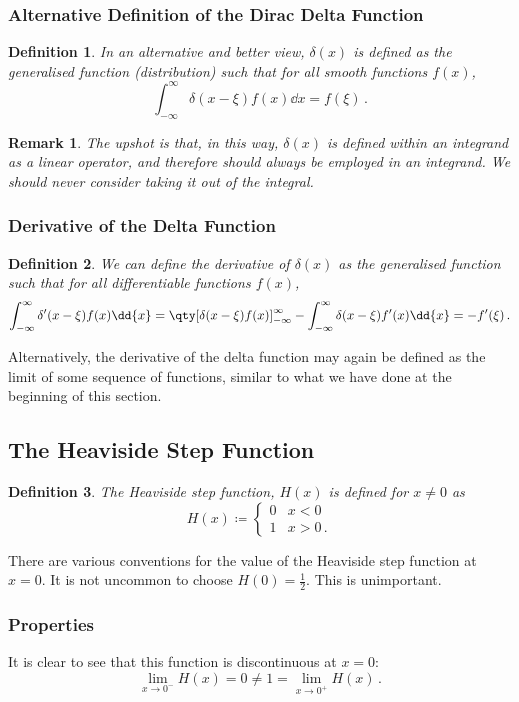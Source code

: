\documentclass{article}
\theoremstyle{plain}\theoremheaderfont{\normalfont\itshape}\theorembodyfont{\rmfamily}\theoremseparator{.}\newtheorem*{rem}{Remark}\newtheorem*{ex}{Example}\newtheorem*{proof}{Proof}\newtheorem*{altp}{Alternative proof}
\theoremstyle{plain}\theoremheaderfont{\normalfont\bfseries}\theorembodyfont{\rmfamily}\theoremseparator{.}\newtheorem{thm}{Theorem}[section]\newtheorem{lem}[thm]{Lemma}\newtheorem{prop}[thm]{Proposition}\newtheorem*{cor}{Corollary}\newtheorem{defn}[thm]{Definition}\newtheorem{clm}[thm]{Claim}\newtheorem{clminproof}{Claim}
\theoremstyle{break}\theoremheaderfont{\normalfont\itshape}\theorembodyfont{\rmfamily}\theoremseparator{.\medskip}\newtheorem*{proofskip}{Proof}\newtheorem*{exs}{Examples}\newtheorem*{rems}{Remarks}
\theoremstyle{break}\theoremheaderfont{\normalfont\bfseries}\theorembodyfont{\rmfamily}\theoremseparator{.\medskip}\newtheorem{lemskip}[thm]{Lemma}\newtheorem{defnskip}[thm]{Definition}\newtheorem{propskip}[thm]{Proposition}\newtheorem{thmskip}[thm]{Theorem}
\numberwithin{equation}{section}
\begin{document}
	\subsubsection{Alternative Definition of the Dirac Delta Function}
	\begin{defn}
		In an alternative and better view, \(\delta(x)\) is defined as the generalised function (distribution) such that for all smooth functions \(f(x)\),
		\[\int_{-\infty}^{\infty}\delta(x-\xi)f(x)\dd{x}=f(\xi)\,.\]
	\end{defn}
	\begin{rem}
		The upshot is that, in this way, \(\delta(x)\) is defined within an integrand as a linear operator, and therefore should always be employed in an integrand. We should never consider taking it out of the integral.
	\end{rem}
	\subsubsection{Derivative of the Delta Function}
	\begin{defn}
		We can define the derivative of \(\delta(x)\) as the generalised function such that for all differentiable functions \(f(x)\),
		\[\int_{-\infty}^{\infty}\delta'(x-\xi)f(x)\dd{x}=\qty[\delta(x-\xi)f(x)]^{\infty}_{-\infty}-\int_{-\infty}^{\infty}\delta(x-\xi)f'(x)\dd{x}=-f'(\xi)\,.\]
	\end{defn}
	
	Alternatively, the derivative of the delta function may again be defined as the limit of some sequence of functions, similar to what we have done at the beginning of this section.
	\subsection{The Heaviside Step Function}
	\begin{defn}
		The \textit{Heaviside step function}, \(H(x)\) is defined for \(x\ne 0\) as
		\[H(x)\coloneqq\begin{cases}
			0 & x<0\\
			1 & x>0\,.
		\end{cases}\]
	\end{defn}
	There are various conventions for the value of the Heaviside step function at \(x=0\). It is not uncommon to choose \(H(0)=\frac{1}{2}\). This is unimportant.
	
	\subsubsection{Properties}
	It is clear to see that this function is discontinuous at \(x=0\):
	\[\lim_{x\to 0^-}H(x)=0\ne1=\lim_{x\to 0^+}H(x)\,.\]
	
\end{document}
